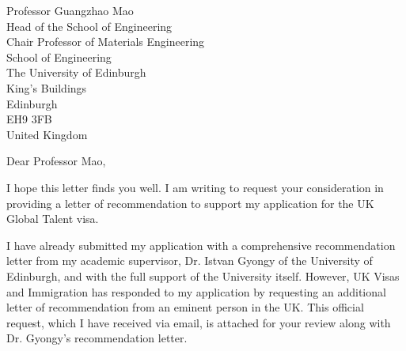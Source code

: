 \documentclass[12pt,a4paper]{letter}
\begin{document}
\begin{letter}{Professor Guangzhao Mao\\Head of the School of Engineering\\Chair Professor of Materials Engineering\\School of Engineering\\The University of Edinburgh\\King's Buildings\\Edinburgh\\EH9 3FB\\United Kingdom}

\date{\today}

\opening{Dear Professor Mao,}

I hope this letter finds you well. I am writing to request your consideration in providing a letter of recommendation to support my application for the UK Global Talent visa.

I have already submitted my application with a comprehensive recommendation letter from my academic supervisor, Dr. Istvan Gyongy of the University of Edinburgh, and with the full support of the University itself. However, UK Visas and Immigration has responded to my application by requesting an additional letter of recommendation from an eminent person in the UK. This official request, which I have received via email, is attached for your review along with Dr. Gyongy's recommendation letter.


\end{letter}
\end{document}
